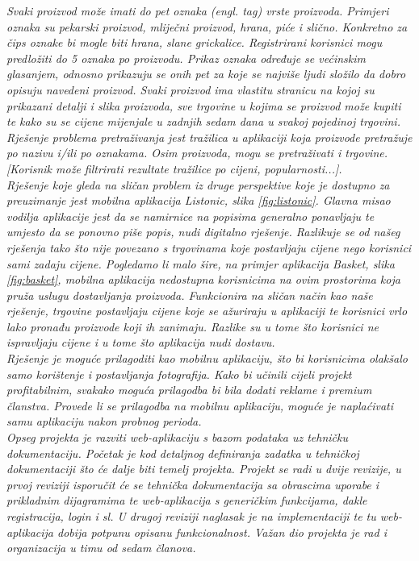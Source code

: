 		\textit{Svaki proizvod može imati do pet oznaka (engl. tag) vrste proizvoda. Primjeri oznaka su pekarski proizvod, mliječni proizvod, hrana, piće i slično. Konkretno za čips oznake bi mogle biti hrana, slane grickalice. Registrirani korisnici mogu predložiti do 5 oznaka po proizvodu. Prikaz oznaka određuje se većinskim glasanjem, odnosno prikazuju se onih pet za koje se najviše ljudi složilo da dobro opisuju navedeni proizvod. Svaki proizvod ima vlastitu stranicu na kojoj su prikazani detalji i slika proizvoda, sve trgovine u kojima se proizvod može kupiti te kako su se cijene mijenjale u zadnjih sedam dana u svakoj pojedinoj trgovini.}\\
		
		\textit{Rješenje problema pretraživanja jest tražilica u aplikaciji koja proizvode pretražuje po nazivu i/ili po oznakama. Osim proizvoda, mogu se pretraživati i trgovine. [Korisnik može filtrirati rezultate tražilice po cijeni, popularnosti...].}\\
		
		\textit{Rješenje koje gleda na sličan problem iz druge perspektive koje je dostupno za preuzimanje jest mobilna aplikacija Listonic, slika \ref{fig:listonic}. Glavna misao vodilja aplikacije jest da se namirnice na popisima generalno ponavljaju te umjesto da se ponovno piše popis, nudi digitalno rješenje. Razlikuje se od našeg rješenja tako što nije povezano s trgovinama koje postavljaju cijene nego korisnici sami zadaju cijene. Pogledamo li malo šire, na primjer aplikacija Basket, slika \ref{fig:basket}, mobilna aplikacija nedostupna korisnicima na ovim prostorima koja pruža uslugu dostavljanja proizvoda. Funkcionira na sličan način kao naše rješenje, trgovine postavljaju cijene koje se ažuriraju u aplikaciji te korisnici vrlo lako pronađu proizvode koji ih zanimaju. Razlike su u tome što korisnici ne ispravljaju cijene i u tome što aplikacija nudi dostavu.}\\
		
		\textit{Rješenje je moguće prilagoditi kao mobilnu aplikaciju, što bi korisnicima olakšalo samo korištenje i postavljanja fotografija. Kako bi učinili cijeli projekt profitabilnim, svakako moguća prilagodba bi bila dodati reklame i premium članstva. Provede li se prilagodba na mobilnu aplikaciju, moguće je naplaćivati samu aplikaciju nakon probnog perioda.}\\
		
		\textit{Opseg projekta je razviti web-aplikaciju s bazom podataka uz tehničku dokumentaciju. Početak je kod detaljnog definiranja zadatka u tehničkoj dokumentaciji što će dalje biti temelj projekta. Projekt se radi u dvije revizije, u prvoj reviziji isporučit će se tehnička dokumentacija sa obrascima uporabe i prikladnim dijagramima te web-aplikacija s generičkim funkcijama, dakle registracija, login i sl. U drugoj reviziji naglasak je na implementaciji te tu web-aplikacija dobija potpunu opisanu funkcionalnost. Važan dio projekta je rad i organizacija u timu od sedam članova.}\\
		
